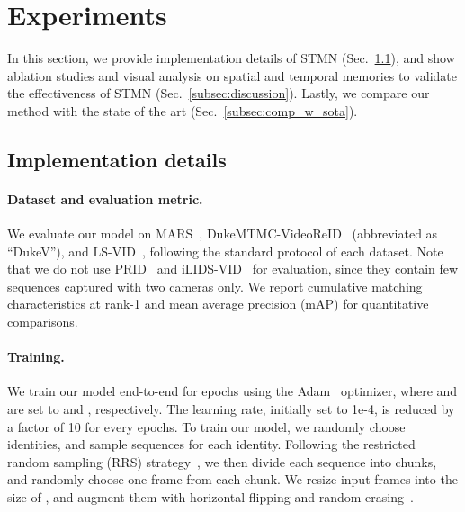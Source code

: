 \documentclass[10pt,twocolumn,letterpaper]{article}
\begin{document}
\vspace{-0.2cm}
\section{Experiments}
\vspace{-0.1cm}
	In this section, we provide implementation details of STMN (Sec.~\ref{subsec:implement}), and show ablation studies and visual analysis on spatial and temporal memories to validate the effectiveness of STMN (Sec.~\ref{subsec:discussion}). Lastly, we compare our method with the state of the art (Sec.~\ref{subsec:comp_w_sota}).

	\vspace{-0.1cm}
	\subsection{Implementation details}  \label{subsec:implement}
	
		\vspace{-0.2cm}
		\paragraph{Dataset and evaluation metric.}
		
			We evaluate our model on MARS~\cite{zheng2016mars}, DukeMTMC-VideoReID~\cite{ristani2016performance,wu2018exploit} (abbreviated as ``DukeV''), and LS-VID~\cite{li2019global}, following the standard protocol of each dataset. Note that we do not use PRID~\cite{hirzer2011person} and iLIDS-VID~\cite{wang2014person} for evaluation, since they contain few sequences captured with two cameras only. We report cumulative matching characteristics at rank-1 and mean average precision (mAP) for quantitative comparisons. 
		
		\vspace{-0.4cm}
		\paragraph{Training.}
		
			We train our model end-to-end for  epochs using the Adam~\cite{kingma2014adam} optimizer, where  and  are set to  and , respectively. The learning rate, initially set to 1e-4, is reduced by a factor of 10 for every  epochs. To train our model, we randomly choose  identities, and sample  sequences for each identity. Following the restricted random sampling (RRS) strategy~\cite{li2018diversity}, we then divide each sequence into  chunks, and randomly choose one frame from each chunk. We resize input frames into the size of , and augment them with horizontal flipping and random erasing~\cite{zhong2017random}.
		
\end{document}
